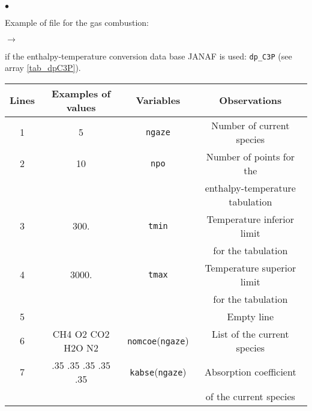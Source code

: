 {{\begin{list}{$\bullet$}{}
       \item Example of file for the gas combustion:
        \begin{list}{$\rightarrow$}{}
               \item if the enthalpy-temperature conversion data base
                     JANAF is used: \texttt{dp\_C3P} (see
                     array \ref{tab_dpC3P}).

\begin{table}[htbp]
\begin{center}
\small{
\begin{tabular}{|c|c|c|c|} \hline
 Lines  &Examples of values &        Variables             & Observations                                     \\ \hline
  1     &         5         &  \texttt{ngaze\index{ngaze}} & Number of current species                        \\ \hline
  2     &        10         &   \texttt{npo\index{npo}}    & Number of points for the                         \\
        &                   &                              & enthalpy-temperature tabulation                  \\ \hline
  3     &       300.        &  \texttt{tmin\index{tmin}}   & Temperature inferior limit                       \\
        &                   &                              & for the tabulation                               \\ \hline
  4     &      3000.        &  \texttt{tmax\index{tmax}}   & Temperature superior limit                       \\
        &                   &                              & for the tabulation                               \\ \hline
  5     &                   &                              & Empty line                                       \\ \hline
  6     & CH4 O2 CO2 H2O N2 &  \texttt{nomcoe\index{nomcoe}}(\texttt{ngaze}) & List of the current species                      \\ \hline
  7     &.35 .35 .35 .35 .35&  \texttt{kabse\index{kabse}}(\texttt{ngaze})   & Absorption coefficient                           \\
        &                   &                              & of  the current species                          \\ \hline

\end{tabular}}
\end{center}
\end{table}
\end{list}
\end{list}}}
